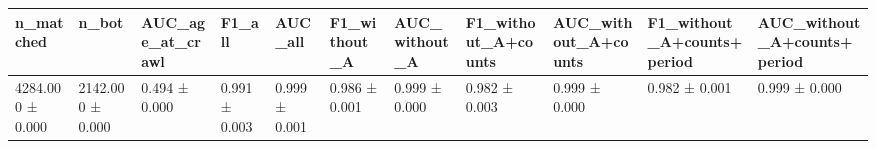 \begin{tabular}{lllllllllll}
\toprule
n_matched & n_bot & AUC_age_at_crawl & F1_all & AUC_all & F1_without_A & AUC_without_A & F1_without_A+counts & AUC_without_A+counts & F1_without_A+counts+period & AUC_without_A+counts+period \\
\midrule
4284.000 ± 0.000 & 2142.000 ± 0.000 & 0.494 ± 0.000 & 0.991 ± 0.003 & 0.999 ± 0.001 & 0.986 ± 0.001 & 0.999 ± 0.000 & 0.982 ± 0.003 & 0.999 ± 0.000 & 0.982 ± 0.001 & 0.999 ± 0.000 \\
\bottomrule
\end{tabular}
